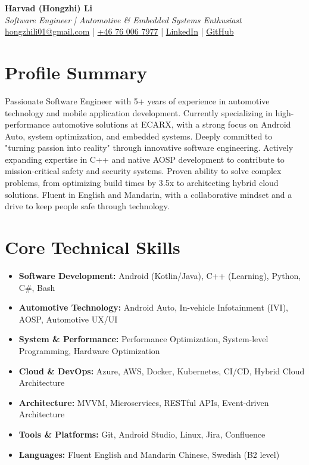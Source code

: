 \documentclass[11pt,a4paper]{article}
\begin{document}
\pagestyle{empty} %

\begin{center}
{\LARGE \textbf{Harvad (Hongzhi) Li}}\\[10pt]
{\Large \textit{Software Engineer | Automotive \& Embedded Systems Enthusiast}}\\[10pt]
\textcolor{titlecolor}{\href{mailto:hongzhili01@gmail.com}{hongzhili01@gmail.com} | \href{tel:+46760067977}{+46 76 006 7977} | \href{https://www.linkedin.com/in/harvad/}{LinkedIn} | \href{https://github.com/bluehawana}{GitHub}}
\end{center}

\section*{Profile Summary}
Passionate Software Engineer with 5+ years of experience in automotive technology and mobile application development. Currently specializing in high-performance automotive solutions at ECARX, with a strong focus on Android Auto, system optimization, and embedded systems. Deeply committed to "turning passion into reality" through innovative software engineering. Actively expanding expertise in C++ and native AOSP development to contribute to mission-critical safety and security systems. Proven ability to solve complex problems, from optimizing build times by 3.5x to architecting hybrid cloud solutions. Fluent in English and Mandarin, with a collaborative mindset and a drive to keep people safe through technology.

\section*{Core Technical Skills}
\begin{itemize}[noitemsep]
\item \textbf{Software Development:} Android (Kotlin/Java), C++ (Learning), Python, C\#, Bash
\item \textbf{Automotive Technology:} Android Auto, In-vehicle Infotainment (IVI), AOSP, Automotive UX/UI
\item \textbf{System \& Performance:} Performance Optimization, System-level Programming, Hardware Optimization
\item \textbf{Cloud \& DevOps:} Azure, AWS, Docker, Kubernetes, CI/CD, Hybrid Cloud Architecture
\item \textbf{Architecture:} MVVM, Microservices, RESTful APIs, Event-driven Architecture
\item \textbf{Tools \& Platforms:} Git, Android Studio, Linux, Jira, Confluence
\item \textbf{Languages:} Fluent English and Mandarin Chinese, Swedish (B2 level)
\end{itemize}
\end{document}
